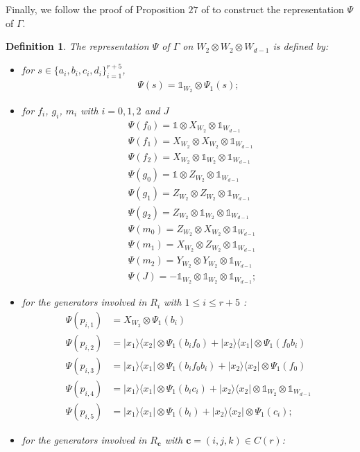 \documentclass[11pt,letterpaper]{article}
\newcommand{\ketbra}[2]{|#1\rangle\langle#2|}
\newcommand{\x}{\otimes}
\newcommand{\1}{\mathbb{1}}
\newcommand{\bc}{\pmb{c}}
\newtheorem{definition}[theorem]{Definition}
\theoremstyle{definition}
\begin{document}
Finally, we follow the proof of Proposition $27$ of \cite{slofstra2017} to construct the 
representation $\Psi$ of $\Gamma$.
\begin{definition}
\label{def:rep_gamma}
The representation $\Psi$ of $\Gamma$ on $W_2 \x W_2 \x W_{d-1}$ is defined by:
\begin{itemize}
\item for $s \in \{a_i, b_i, c_i, d_i\}_{i=1}^{r+5}$,
\begin{align*}
	\Psi(s) = \1_{W_2} \x \Psi_1(s);
\end{align*}
\item for $f_i$, $g_i$, $m_i$ with $i = 0,1,2$ and $J$
\begin{align*}
    &\Psi(f_0) = \1 \x X_{W_2} \x \1_{W_{d-1}} \\
	&\Psi(f_1) = X_{W_2} \x X_{W_2} \x \1_{W_{d-1}} \\
	&\Psi(f_2) = X_{W_2} \x \1_{W_2} \x \1_{W_{d-1}} \\
	&\Psi(g_0) = \1 \x Z_{W_2} \x \1_{W_{d-1}} \\
	&\Psi(g_1) = Z_{W_2} \x Z_{W_2} \x \1_{W_{d-1}} \\
	&\Psi(g_2) = Z_{W_2} \x \1_{W_2} \x \1_{W_{d-1}} \\
	& \Psi(m_0) = Z_{W_2} \x X_{W_2} \x \1_{W_{d-1}}\\
	& \Psi(m_1) = X_{W_2} \x Z_{W_2} \x \1_{W_{d-1}}\\
	& \Psi(m_2) = Y_{W_2} \x Y_{W_2} \x \1_{W_{d-1}}\\
	& \Psi(J) = - \1_{W_2} \x \1_{W_2} \x \1_{W_{d-1}};
\end{align*}
\item for the generators involved in $R_i$
with $1 \leq i \leq r+5$ :
\begin{align*}
	\Psi(p_{i,1}) &= X_{W_2} \x \Psi_1(b_i) \\
	\Psi(p_{i,2}) &= \ketbra{x_1}{x_2} \x \Psi_1(b_if_0) + \ketbra{x_2}{x_1} \x \Psi_1(f_0b_i)\\
	\Psi(p_{i,3}) &= \ketbra{x_1}{x_1} \x \Psi_1(b_if_0b_i) + \ketbra{x_2}{x_2} \x \Psi_1(f_0) \\
	\Psi(p_{i,4}) &= \ketbra{x_1}{x_1} \x \Psi_1(b_ic_i) + \ketbra{x_2}{x_2} \x \1_{W_2} \x \1_{W_{d-1}}\\
    \Psi(p_{i,5}) &= \ketbra{x_1}{x_1} \x \Psi_1(b_i) + \ketbra{x_2}{x_2} \x \Psi_1(c_i);
\end{align*}
\item for the generators involved in $R_{\bc}$ with $\bc = (i,j,k) \in C(r)$:
\begin{align*}

\end{align*}
\end{itemize}
\end{definition}
\end{document}
